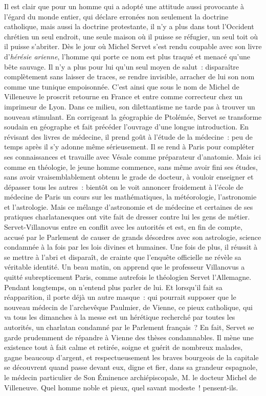 \documentclass[french,twoside]{book} %
\begin{document}
Il est clair que pour un homme qui a adopté une attitude aussi provocante à l’égard du monde entier, qui déclare erronées non seulement la doctrine catholique, mais aussi la doctrine protestante, il n’y a plus dans tout l’Occident chrétien un seul endroit, une seule maison où il puisse se réfugier, un seul toit où il puisse s’abriter. Dès le jour où Michel Servet s’est rendu coupable avec son livre d’\emph{hérésie arienne}, l’homme qui porte ce nom est plus traqué et menacé qu’une bête sauvage. Il n’y a plus pour lui qu’un seul moyen de salut : disparaître complètement sans laisser de traces, se rendre invisible, arracher de lui son nom comme une tunique empoisonnée. C’est ainsi que sous le nom de Michel de Villeneuve le proscrit retourne en France et entre comme correcteur chez un imprimeur de Lyon. Dans ce milieu, son dilettantisme ne tarde pas à trouver un nouveau stimulant. En corrigeant la géographie de Ptolémée, Servet se transforme soudain en géographe et fait précéder l’ouvrage d’une longue introduction. En révisant des livres de médecine, il prend goût à l’étude de la médecine : peu de temps après il s’y adonne même sérieusement. Il se rend à Paris pour compléter ses connaissances et travaille avec Vésale comme préparateur d’anatomie. Mais ici comme en théologie, le jeune homme commence, sans même avoir fini ses études, sans avoir vraisemblablement obtenu le grade de docteur, à vouloir enseigner et dépasser tous les autres : bientôt on le voit annoncer froidement à l’école de médecine de Paris un cours sur les mathématiques, la météorologie, l’astronomie et l’astrologie. Mais ce mélange d’astronomie et de médecine et certaines de ses pratiques charlatanesques ont vite fait de dresser contre lui les gens de métier. Servet-Villanovus entre en conflit avec les autorités et est, en fin de compte, accusé par le Parlement de causer de grands désordres avec son astrologie, science condamnée à la fois par les lois divines et humaines. Une fois de plus, il réussit à se mettre à l’abri et disparaît, de crainte que l’enquête officielle ne révèle sa véritable identité. Un beau matin, on apprend que le professeur Villanovus a quitté subrepticement Paris, comme autrefois le théologien Servet l’Allemagne. Pendant longtemps, on n’entend plus parler de lui. Et lorsqu’il fait sa réapparition, il porte déjà un autre masque : qui pourrait supposer que le nouveau médecin de l’archevêque Paulmier, de Vienne, ce pieux catholique, qui va tous les dimanches à la messe est un hérétique recherché par toutes les autorités, un charlatan condamné par le Parlement français ? En fait, Servet se garde prudemment de répandre à Vienne des thèses condamnables. Il mène une existence tout à fait calme et retirée, soigne et guérit de nombreux malades, gagne beaucoup d’argent, et respectueusement les braves bourgeois de la capitale se découvrent quand passe devant eux, digne et fier, dans sa grandeur espagnole, le médecin particulier de Son Éminence archiépiscopale, M. le docteur Michel de Villeneuve. Quel homme noble et pieux, quel savant modeste ! pensent-ils.\par
\end{document}
